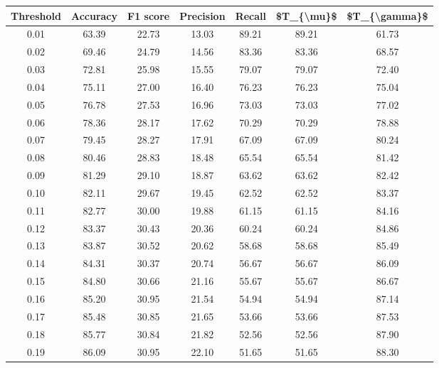 \begin{tabular}{|c|c|c|c|c|c|c|}
\hline
 Threshold &  Accuracy &  F1 score &  Precision &  Recall &  \$T\_\{\textbackslash mu\}\$ &  \$T\_\{\textbackslash gamma\}\$ \\
\hline
      0.01 &     63.39 &     22.73 &      13.03 &   89.21 &      89.21 &         61.73 \\
      0.02 &     69.46 &     24.79 &      14.56 &   83.36 &      83.36 &         68.57 \\
      0.03 &     72.81 &     25.98 &      15.55 &   79.07 &      79.07 &         72.40 \\
      0.04 &     75.11 &     27.00 &      16.40 &   76.23 &      76.23 &         75.04 \\
      0.05 &     76.78 &     27.53 &      16.96 &   73.03 &      73.03 &         77.02 \\
      0.06 &     78.36 &     28.17 &      17.62 &   70.29 &      70.29 &         78.88 \\
      0.07 &     79.45 &     28.27 &      17.91 &   67.09 &      67.09 &         80.24 \\
      0.08 &     80.46 &     28.83 &      18.48 &   65.54 &      65.54 &         81.42 \\
      0.09 &     81.29 &     29.10 &      18.87 &   63.62 &      63.62 &         82.42 \\
      0.10 &     82.11 &     29.67 &      19.45 &   62.52 &      62.52 &         83.37 \\
      0.11 &     82.77 &     30.00 &      19.88 &   61.15 &      61.15 &         84.16 \\
      0.12 &     83.37 &     30.43 &      20.36 &   60.24 &      60.24 &         84.86 \\
      0.13 &     83.87 &     30.52 &      20.62 &   58.68 &      58.68 &         85.49 \\
      0.14 &     84.31 &     30.37 &      20.74 &   56.67 &      56.67 &         86.09 \\
      0.15 &     84.80 &     30.66 &      21.16 &   55.67 &      55.67 &         86.67 \\
      0.16 &     85.20 &     30.95 &      21.54 &   54.94 &      54.94 &         87.14 \\
      0.17 &     85.48 &     30.85 &      21.65 &   53.66 &      53.66 &         87.53 \\
      0.18 &     85.77 &     30.84 &      21.82 &   52.56 &      52.56 &         87.90 \\
      0.19 &     86.09 &     30.95 &      22.10 &   51.65 &      51.65 &         88.30 \\

\end{tabular}
